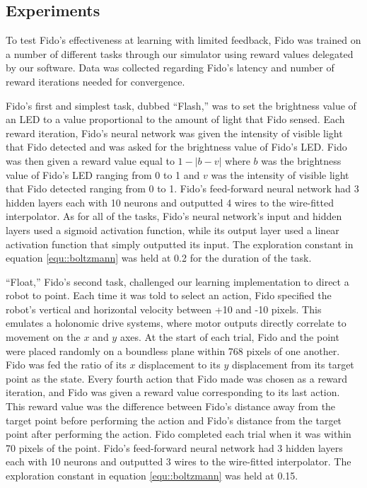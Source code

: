 \subsection{Experiments}

To test Fido's effectiveness at learning with limited feedback, Fido was trained on a number of different tasks through our simulator using reward values delegated by our software. Data was collected regarding Fido's latency and number of reward iterations needed for convergence.

Fido's first and simplest task, dubbed ``Flash,'' was to set the brightness value of an LED to a value proportional to the amount of light that Fido sensed. Each reward iteration, Fido's neural network was given the intensity of visible light that Fido detected and was asked for the brightness value of Fido's LED. Fido was then given a reward value equal to $1 - |b - v|$ where $b$ was the brightness value of Fido's LED ranging from 0 to 1 and $v$ was the intensity of visible light that Fido detected ranging from 0 to 1. Fido's feed-forward neural network had 3 hidden layers each with 10 neurons and outputted 4 wires to the wire-fitted interpolator. As for all of the tasks, Fido's neural network's input and hidden layers used a sigmoid activation function, while  its output layer used a linear activation function that simply outputted its input. The exploration constant in equation \ref{equ::boltzmann} was held at 0.2 for the duration of the task.

``Float,'' Fido's second task, challenged our learning implementation to direct a robot to point. Each time it was told to select an action, Fido specified the robot's vertical and horizontal velocity between +10 and -10 pixels. This emulates a holonomic drive systems, where motor outputs directly correlate to movement on the $x$ and $y$ axes. At the start of each trial, Fido and the point were placed randomly on a boundless plane within 768 pixels of one another. Fido was fed the ratio of its $x$ displacement to its $y$ displacement from its target point as the state. Every fourth action that Fido made was chosen as a reward iteration, and Fido was given a reward value corresponding to its last action. This reward value was the difference between Fido's distance away from the target point before performing the action and Fido's distance from the target point after performing the action. Fido completed each trial when it was within 70 pixels of the point. Fido's feed-forward neural network had 3 hidden layers each with 10 neurons and outputted 3 wires to the wire-fitted interpolator. The exploration constant in equation \ref{equ::boltzmann} was held at 0.15.

